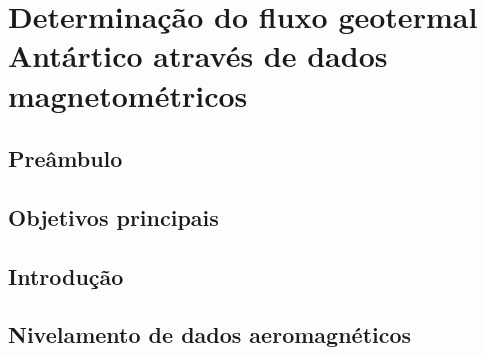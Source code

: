 \documentclass[11pt,a4paper,oneside]{book}
\begin{document}
\chapter{Determinação do fluxo geotermal Antártico através de dados magnetométricos}

\section{Preâmbulo}

\section{Objetivos principais}

\section{Introdução}

\section{Nivelamento de dados aeromagnéticos}









\end{document}
